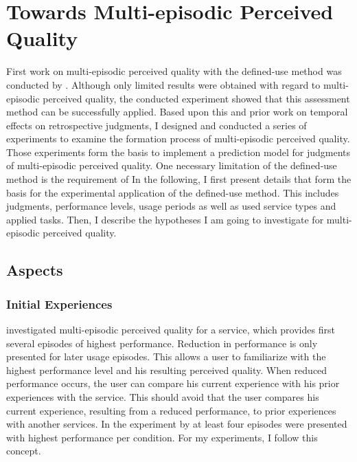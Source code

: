 \chapter{Towards Multi-episodic Perceived Quality}\label{chap:towards}
First work on multi-episodic perceived quality with the  defined-use method was conducted by \citet{moller_single-call_2011}.
Although only limited results were obtained with regard to multi-episodic perceived quality, the conducted experiment showed that this assessment method can be successfully applied.
Based upon this and prior work on temporal effects on retrospective judgments, I designed and conducted a series of experiments to examine the formation process of multi-episodic perceived quality. 
Those experiments form the basis to implement a prediction model for judgments of multi-episodic perceived quality.
One necessary limitation of the defined-use method is the requirement of 
In the following, I first present details that form the basis for the experimental application of the defined-use method.
This includes judgments, performance levels, usage periods as well as used service types and applied tasks.
Then, I describe the hypotheses I am going to investigate for multi-episodic perceived quality.

\section{Aspects}

\subsection{Initial Experiences}
\citet{moller_single-call_2011} investigated multi-episodic perceived quality for a service, which provides first several episodes of highest performance.
Reduction in performance is only presented for later usage episodes.
This allows a user to familiarize with the highest performance level and his resulting perceived quality.
When reduced performance occurs, the user can compare his current experience with his prior experiences with the service.
This should avoid that the user compares his current experience, resulting from a reduced performance, to prior experiences with another services.
In the experiment by \citet{moller_single-call_2011} at least four episodes were presented with highest performance per condition.
For my experiments, I follow this concept.

